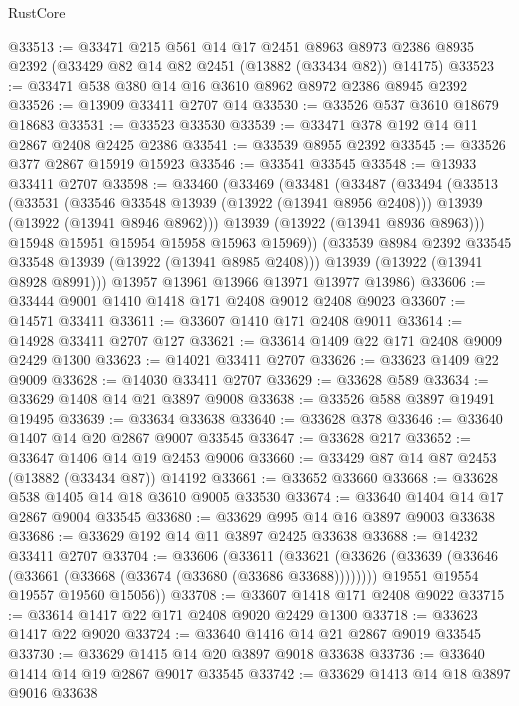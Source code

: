 \begin{lexlean}{RustCore}
\begin{coremodule}
@33513 := @33471
    @215
    @561
    @14
    @17
    @2451
    @8963
    @8973
    @2386
    @8935
    @2392
    (@33429 @82 @14 @82 @2451 (@13882 (@33434 @82)) @14175)
@33523 := @33471 @538 @380 @14 @16 @3610 @8962 @8972 @2386 @8945 @2392
@33526 := @13909 @33411 @2707 @14
@33530 := @33526 @537 @3610 @18679 @18683
@33531 := @33523 @33530
@33539 := @33471 @378 @192 @14 @11 @2867 @2408 @2425 @2386
@33541 := @33539 @8955 @2392
@33545 := @33526 @377 @2867 @15919 @15923
@33546 := @33541 @33545
@33548 := @13933 @33411 @2707
@33598 := @33460
    (@33469
      (@33481
        (@33487
          (@33494
            (@33513
              (@33531
                (@33546 @33548 @13939 (@13922 (@13941 @8956 @2408)))
                @13939
                (@13922 (@13941 @8946 @8962)))
              @13939
              (@13922 (@13941 @8936 @8963)))
            @15948
            @15951
            @15954
            @15958
            @15963
            @15969))
        (@33539 @8984 @2392 @33545 @33548 @13939 (@13922 (@13941 @8985 @2408)))
        @13939
        (@13922 (@13941 @8928 @8991)))
      @13957
      @13961
      @13966
      @13971
      @13977
      @13986)
@33606 := @33444 @9001 @1410 @1418 @171 @2408 @9012 @2408 @9023
@33607 := @14571 @33411
@33611 := @33607 @1410 @171 @2408 @9011
@33614 := @14928 @33411 @2707 @127
@33621 := @33614 @1409 @22 @171 @2408 @9009 @2429 @1300
@33623 := @14021 @33411 @2707
@33626 := @33623 @1409 @22 @9009
@33628 := @14030 @33411 @2707
@33629 := @33628 @589
@33634 := @33629 @1408 @14 @21 @3897 @9008
@33638 := @33526 @588 @3897 @19491 @19495
@33639 := @33634 @33638
@33640 := @33628 @378
@33646 := @33640 @1407 @14 @20 @2867 @9007 @33545
@33647 := @33628 @217
@33652 := @33647 @1406 @14 @19 @2453 @9006
@33660 := @33429 @87 @14 @87 @2453 (@13882 (@33434 @87)) @14192
@33661 := @33652 @33660
@33668 := @33628 @538 @1405 @14 @18 @3610 @9005 @33530
@33674 := @33640 @1404 @14 @17 @2867 @9004 @33545
@33680 := @33629 @995 @14 @16 @3897 @9003 @33638
@33686 := @33629 @192 @14 @11 @3897 @2425 @33638
@33688 := @14232 @33411 @2707
@33704 := @33606
    (@33611
      (@33621
        (@33626 (@33639 (@33646 (@33661 (@33668 (@33674 (@33680 (@33686 @33688))))))))
        @19551
        @19554
        @19557
        @19560
        @15056))
@33708 := @33607 @1418 @171 @2408 @9022
@33715 := @33614 @1417 @22 @171 @2408 @9020 @2429 @1300
@33718 := @33623 @1417 @22 @9020
@33724 := @33640 @1416 @14 @21 @2867 @9019 @33545
@33730 := @33629 @1415 @14 @20 @3897 @9018 @33638
@33736 := @33640 @1414 @14 @19 @2867 @9017 @33545
@33742 := @33629 @1413 @14 @18 @3897 @9016 @33638

\end{coremodule}
\end{lexlean}
